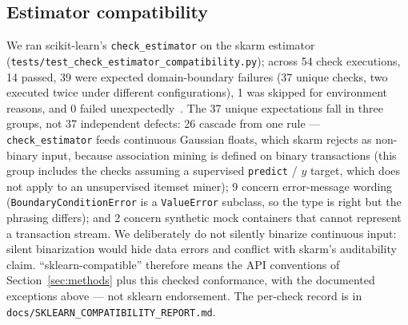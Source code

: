 \documentclass[twocolumn,10pt]{article}
\begin{document}
\subsection{Estimator compatibility}
\label{sec:estimator-checks}
We ran scikit-learn's \texttt{check\_estimator} on the skarm estimator
(\texttt{tests/test\_check\_estimator\_\allowbreak{}compatibility.py}); across 54 check
executions, 14 passed, 39 were expected domain-boundary failures (37 unique
checks, two executed twice under different configurations), 1 was skipped for
environment reasons, and 0 failed unexpectedly~\cite{sklearnchecks}. The 37
unique expectations fall in three groups, not 37 independent defects: 26
cascade from one rule --- \texttt{check\_estimator} feeds continuous Gaussian
floats, which skarm rejects as non-binary input, because association mining is
defined on binary transactions (this group includes the checks assuming a
supervised \texttt{predict} / $y$ target, which does not apply to an
unsupervised itemset miner); 9 concern error-message wording
(\texttt{BoundaryConditionError} is a \texttt{ValueError} subclass, so the
type is right but the phrasing differs); and 2 concern synthetic mock
containers that cannot represent a transaction stream. We deliberately do not
silently binarize continuous input: silent binarization would hide data
errors and conflict with skarm's auditability claim.
``sklearn-compatible'' therefore means the API conventions of
Section~\ref{sec:methods} plus this checked conformance, with the documented
exceptions above --- not sklearn endorsement. The per-check record is in
\texttt{docs/SKLEARN\_COMPATIBILITY\_REPORT.md}.
\end{document}

